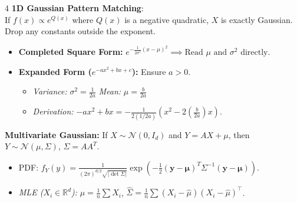 \documentclass[9pt]{extarticle}
\begin{document}
\begin{multicols*}{4}
\textbf{1D Gaussian Pattern Matching}: \\
If $f(x) \propto e^{Q(x)}$ where $Q(x)$ is a negative quadratic, $X$ is exactly Gaussian. Drop any constants outside the exponent.
\begin{itemize}
    \item \textbf{Completed Square Form:} $e^{-\frac{1}{2\sigma^2}(x-\mu)^2} \implies \text{Read } \mu \text{ and } \sigma^2 \text{ directly.}$
    \item \textbf{Expanded Form ($e^{-ax^2 + bx + c}$):} Ensure $a > 0$.
    \begin{itemize}
        \item \textit{Variance:} $\sigma^2 = \frac{1}{2a}$ \qquad \textit{Mean:} $\mu = \frac{b}{2a}$
        \item \textit{Derivation:} $-ax^2+bx = -\frac{1}{2(1/2a)}(x^2 - 2(\frac{b}{2a})x)$.
    \end{itemize}
\end{itemize}
\vspace{0.3cm}

\textbf{Multivariate Gaussian:} If $X \sim \mathcal{N}(0, I_d)$ and $Y = AX + \mu$, then $Y \sim \mathcal{N}(\mu, \Sigma)$, $\Sigma = AA^T$.
\begin{itemize}
    \item PDF: $f_Y(y) = \frac{1}{(2\pi)^{d/2}\sqrt{|\det \Sigma|}} \exp(-\frac{1}{2}(\mathbf{y}-\boldsymbol{\mu})^T \Sigma^{-1} (\mathbf{y}-\boldsymbol{\mu}))$.
    \item \textit{MLE ($X_i\in\mathbb{R}^d$):} $\hat{\mu} = \frac{1}{n}\sum X_i$, $\hat{\Sigma} = \frac{1}{n}\sum (X_i - \hat{\mu})(X_i - \hat{\mu})^\top$.
    

\end{itemize}
\end{multicols*}
\end{document}
